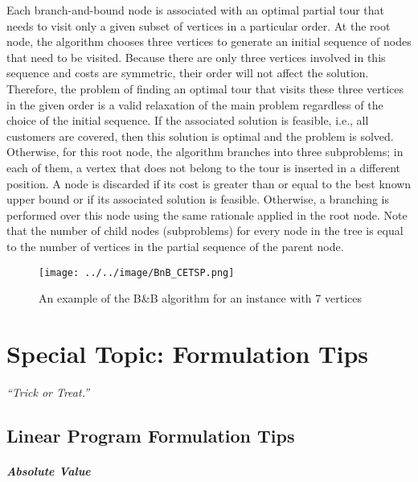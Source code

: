                 Each branch-and-bound node is associated with an optimal partial tour that needs to visit only a given subset of vertices in a particular order. At the root node, the algorithm chooses three vertices to generate an initial sequence of nodes that need to be visited. Because there are only three vertices involved in this sequence and costs are symmetric, their order will not affect the solution. Therefore, the problem of finding an optimal tour that visits these three vertices in the given order is a valid relaxation of the main problem regardless of the choice of the initial sequence. If the associated solution is feasible, i.e., all customers are covered, then this solution is optimal and the problem is solved. Otherwise, for this root node, the algorithm branches into three subproblems; in each of them, a vertex that does not belong to the tour is inserted in a different position. A node is discarded if its cost is greater than or equal to the best known upper bound or if its associated solution is feasible. Otherwise, a branching is performed over this node using the same rationale applied in the root node. Note that the number of child nodes (subproblems) for every node in the tree is equal to the number of vertices in the partial sequence of the parent node. \citep{Coutinho2016}

                \begin{figure}[H]
                    \centering
                    \texttt{[image: ../../image/BnB\_CETSP.png]}
                    \caption{An example of the B\&B algorithm for an instance with 7 vertices}
                    \label{fig:BnB_CETSP}
                \end{figure}

    \chapter{Special Topic: Formulation Tips}
        \begin{center}
            \textit{``Trick or Treat.''}
        \end{center}

        \section{Linear Program Formulation Tips}
            \paragraph{Absolute Value}
                
